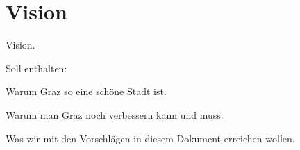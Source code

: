 \chapter*{Vision}
Vision.

Soll enthalten:

Warum Graz so eine schöne Stadt ist.

Warum man Graz noch verbessern kann und muss.

Was wir mit den Vorschlägen in diesem Dokument erreichen wollen.